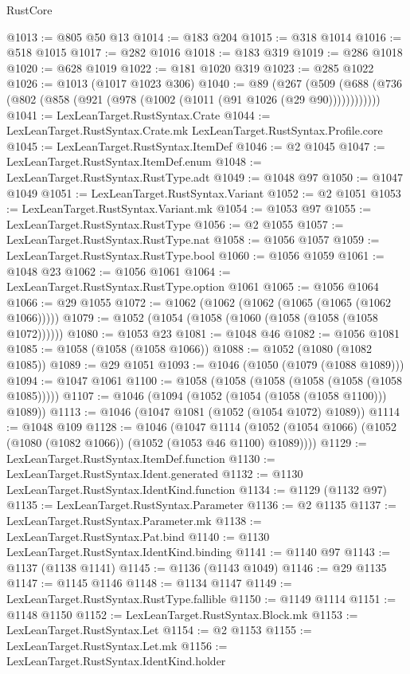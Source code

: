 \begin{lexlean}{RustCore}
\begin{coremodule}
@1013 := @805 @50 @13
@1014 := @183 @204
@1015 := @318 @1014
@1016 := @518 @1015
@1017 := @282 @1016
@1018 := @183 @319
@1019 := @286 @1018
@1020 := @628 @1019
@1022 := @181 @1020 @319
@1023 := @285 @1022
@1026 := @1013 (@1017 @1023 @306)
@1040 := @89
    (@267 (@509 (@688 (@736 (@802 (@858 (@921 (@978 (@1002 (@1011 (@91 @1026 (@29 @90))))))))))))
@1041 := LexLeanTarget.RustSyntax.Crate
@1044 := LexLeanTarget.RustSyntax.Crate.mk LexLeanTarget.RustSyntax.Profile.core
@1045 := LexLeanTarget.RustSyntax.ItemDef
@1046 := @2 @1045
@1047 := LexLeanTarget.RustSyntax.ItemDef.enum
@1048 := LexLeanTarget.RustSyntax.RustType.adt
@1049 := @1048 @97
@1050 := @1047 @1049
@1051 := LexLeanTarget.RustSyntax.Variant
@1052 := @2 @1051
@1053 := LexLeanTarget.RustSyntax.Variant.mk
@1054 := @1053 @97
@1055 := LexLeanTarget.RustSyntax.RustType
@1056 := @2 @1055
@1057 := LexLeanTarget.RustSyntax.RustType.nat
@1058 := @1056 @1057
@1059 := LexLeanTarget.RustSyntax.RustType.bool
@1060 := @1056 @1059
@1061 := @1048 @23
@1062 := @1056 @1061
@1064 := LexLeanTarget.RustSyntax.RustType.option @1061
@1065 := @1056 @1064
@1066 := @29 @1055
@1072 := @1062 (@1062 (@1062 (@1065 (@1065 (@1062 @1066)))))
@1079 := @1052 (@1054 (@1058 (@1060 (@1058 (@1058 (@1058 @1072))))))
@1080 := @1053 @23
@1081 := @1048 @46
@1082 := @1056 @1081
@1085 := @1058 (@1058 (@1058 @1066))
@1088 := @1052 (@1080 (@1082 @1085))
@1089 := @29 @1051
@1093 := @1046 (@1050 (@1079 (@1088 @1089)))
@1094 := @1047 @1061
@1100 := @1058 (@1058 (@1058 (@1058 (@1058 (@1058 @1085)))))
@1107 := @1046 (@1094 (@1052 (@1054 (@1058 (@1058 @1100))) @1089))
@1113 := @1046 (@1047 @1081 (@1052 (@1054 @1072) @1089))
@1114 := @1048 @109
@1128 := @1046
    (@1047
      @1114
      (@1052 (@1054 @1066) (@1052 (@1080 (@1082 @1066)) (@1052 (@1053 @46 @1100) @1089))))
@1129 := LexLeanTarget.RustSyntax.ItemDef.function
@1130 := LexLeanTarget.RustSyntax.Ident.generated
@1132 := @1130 LexLeanTarget.RustSyntax.IdentKind.function
@1134 := @1129 (@1132 @97)
@1135 := LexLeanTarget.RustSyntax.Parameter
@1136 := @2 @1135
@1137 := LexLeanTarget.RustSyntax.Parameter.mk
@1138 := LexLeanTarget.RustSyntax.Pat.bind
@1140 := @1130 LexLeanTarget.RustSyntax.IdentKind.binding
@1141 := @1140 @97
@1143 := @1137 (@1138 @1141)
@1145 := @1136 (@1143 @1049)
@1146 := @29 @1135
@1147 := @1145 @1146
@1148 := @1134 @1147
@1149 := LexLeanTarget.RustSyntax.RustType.fallible
@1150 := @1149 @1114
@1151 := @1148 @1150
@1152 := LexLeanTarget.RustSyntax.Block.mk
@1153 := LexLeanTarget.RustSyntax.Let
@1154 := @2 @1153
@1155 := LexLeanTarget.RustSyntax.Let.mk
@1156 := LexLeanTarget.RustSyntax.IdentKind.holder

\end{coremodule}
\end{lexlean}
